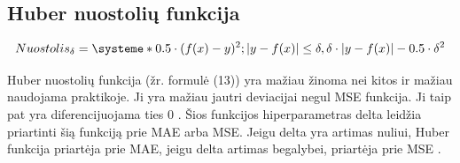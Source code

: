 \documentclass{VUMIFInfKursinis}
\begin{document}
\subsection{Huber nuostolių funkcija}
\begin{equation}
  Nuostolis_{\delta} = \systeme*{
 0.5\cdot(f(x) - y)^2; \abs{y - f(x)} \leq \delta,
 \delta \cdot \abs{y - f(x)} - 0.5 \cdot \delta^2
                       }
\end{equation}
\par
Huber nuostolių funkcija (žr. formulė (13)) yra mažiau žinoma nei kitos ir mažiau naudojama
praktikoje. Ji yra mažiau jautri deviacijai negul MSE funkcija.
Ji taip pat yra diferencijuojama ties 0 \cite{salt12}.
Šios funkcijos hiperparametras delta leidžia priartinti šią
funkciją prie MAE arba MSE. Jeigu delta yra artimas nuliui,
Huber funkcija priartėja prie MAE, jeigu delta artimas begalybei, priartėja prie MSE \cite{salt12}.

\end{document}
